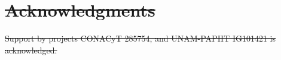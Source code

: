 \documentclass[10pt,letterpaper]{article} %
\providecommand{\DIFdeltex}[1]{{\protect\color{red}\sout{#1}}}                      %
\providecommand{\DIFdelend}{} %
\providecommand{\DIFdel}[1]{\texorpdfstring{\DIFdeltex{#1}}{}} %
\DeclareRobustCommand{\DIFdelend}{\DIFOaddend \let\includegraphics\DIFOincludegraphics} %
\begin{document}
\section{\DIFdel{Acknowledgments}} %
\addtocounter{section}{-1}%
\DIFdel{Support by projects CONACyT 285754, and UNAM-PAPIIT IG101421 is acknowledged. 
}\DIFdelend %






%
%

\appendix
\end{document}
